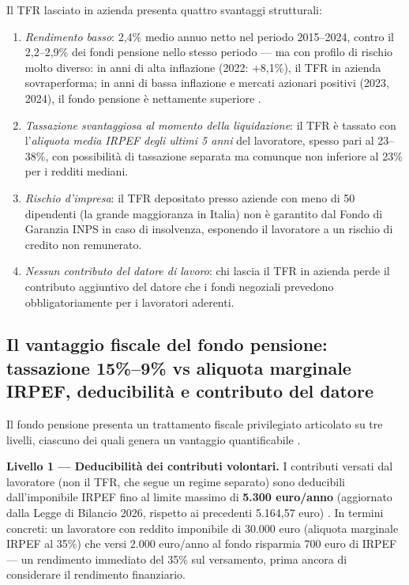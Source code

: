 \medskip
\noindent
Il TFR lasciato in azienda presenta quattro svantaggi strutturali:
\begin{enumerate}
    \item \emph{Rendimento basso}: 2,4\% medio annuo netto nel periodo
          2015--2024, contro il 2,2--2,9\% dei fondi pensione nello
          stesso periodo — ma con profilo di rischio molto diverso:
          in anni di alta inflazione (2022: +8,1\%), il TFR in azienda
          sovraperforma; in anni di bassa inflazione e mercati azionari
          positivi (2023, 2024), il fondo pensione è nettamente superiore
          \cite{web:83, web:66}.
    \item \emph{Tassazione svantaggiosa al momento della liquidazione}:
          il TFR è tassato con l'\emph{aliquota media IRPEF degli ultimi
          5 anni} del lavoratore, spesso pari al 23--38\%, con
          possibilità di tassazione separata ma comunque non inferiore
          al 23\% per i redditi mediani.
    \item \emph{Rischio d'impresa}: il TFR depositato presso aziende
          con meno di 50 dipendenti (la grande maggioranza in Italia)
          non è garantito dal Fondo di Garanzia INPS in caso di
          insolvenza, esponendo il lavoratore a un rischio di credito
          non remunerato.
    \item \emph{Nessun contributo del datore di lavoro}: chi lascia
          il TFR in azienda perde il contributo aggiuntivo del datore
          che i fondi negoziali prevedono obbligatoriamente per i
          lavoratori aderenti.
\end{enumerate}

\subsection{Il vantaggio fiscale del fondo pensione: tassazione
            15\%--9\% vs aliquota marginale IRPEF,
            deducibilità e contributo del datore}
\label{sub:vantaggio_fiscale}

\noindent
Il fondo pensione presenta un trattamento fiscale privilegiato
articolato su tre livelli, ciascuno dei quali genera un vantaggio
quantificabile \cite{web:78, web:84, web:93}.

\medskip
\noindent
\textbf{Livello 1 — Deducibilità dei contributi volontari.}
I contributi versati dal lavoratore (non il TFR, che segue un
regime separato) sono deducibili dall'imponibile IRPEF fino al
limite massimo di \textbf{5.300 euro/anno} (aggiornato dalla
Legge di Bilancio 2026, rispetto ai precedenti 5.164,57 euro)
\cite{web:93}.
In termini concreti: un lavoratore con reddito imponibile di 30.000 euro
(aliquota marginale IRPEF al 35\%) che versi 2.000 euro/anno al fondo
risparmia 700 euro di IRPEF — un rendimento immediato del 35\%
sul versamento, prima ancora di considerare il rendimento finanziario.

